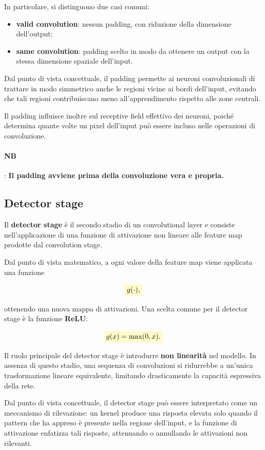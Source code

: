 \documentclass[a4paper,12pt]{report}
\newcommand{\highlight}[1]{%
\colorbox{yellow!20}{$\displaystyle #1$}%
}
\begin{document}
In particolare, si distinguono due casi comuni:
\begin{itemize}
    \item \textbf{valid convolution}: nessun padding, con riduzione della dimensione dell’output;
    \item \textbf{same convolution}: padding scelto in modo da ottenere un output con la stessa dimensione spaziale dell’input.
\end{itemize}

Dal punto di vista concettuale, il padding permette ai neuroni convoluzionali di trattare in modo simmetrico anche le regioni vicine ai bordi dell’input, evitando che tali regioni contribuiscano meno all’apprendimento rispetto alle zone centrali.

Il padding influisce inoltre sul receptive field effettivo dei neuroni, poiché determina quante volte un pixel dell’input può essere incluso nelle operazioni di convoluzione.

\paragraph{NB}: \textbf{Il padding avviene prima della convoluzione vera e propria.}


\subsection{Detector stage}

Il \textbf{detector stage} è il secondo stadio di un convolutional layer e consiste nell’applicazione di una funzione di attivazione non lineare alle feature map prodotte dal convolution stage.

Dal punto di vista matematico, a ogni valore della feature map viene applicata una funzione

\[
\highlight{
g(\cdot),}
\]

ottenendo una nuova mappa di attivazioni.  
Una scelta comune per il detector stage è la funzione \textbf{ReLU}:

\[
\highlight{
g(x) = \max(0, x).}
\]

Il ruolo principale del detector stage è introdurre \textbf{non linearità} nel modello.  
In assenza di questo stadio, una sequenza di convoluzioni si ridurrebbe a un’unica trasformazione lineare equivalente, limitando drasticamente la capacità espressiva della rete.

Dal punto di vista concettuale, il detector stage può essere interpretato come un meccanismo di rilevazione:  
un kernel produce una risposta elevata solo quando il pattern che ha appreso è presente nella regione dell’input, e la funzione di attivazione enfatizza tali risposte, attenuando o annullando le attivazioni non rilevanti.
\end{document}
